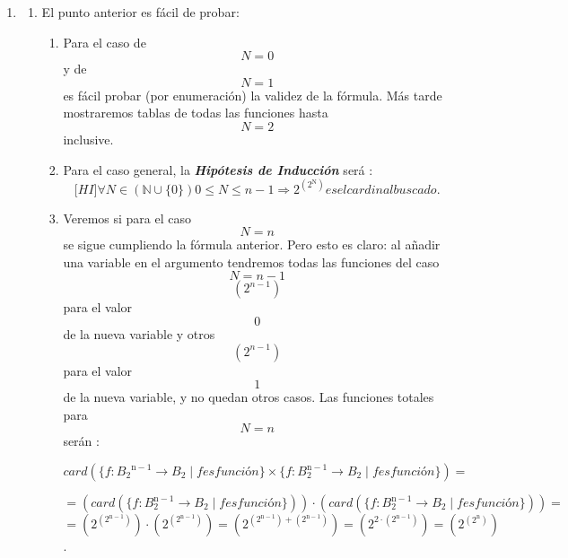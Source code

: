 \documentclass[
]{article}
\begin{document}
\begin{enumerate}
\def\labelenumi{\arabic{enumi}.}
\setcounter{enumi}{6}
\item
  \begin{enumerate}
  \def\labelenumii{\arabic{enumii}.}
  \item
    El punto anterior es fácil de probar:

    \begin{enumerate}
    \def\labelenumiii{\arabic{enumiii}.}
    \item
      Para el caso de \[N = 0\] y de \[N = 1\] es fácil probar (por
      enumeración) la vali\-dez de la fórmula. Más tarde mostraremos
      tablas de todas las funciones hasta \[N = 2\] inclusive.
    \item
      Para el caso general, la \emph{\textbf{Hipótesis de Inducción}}
      será
      :\[{\lbrack\mathbf{\mathit{HI}}\rbrack}\forall{N \in {({\mathbb{N} \cup {\{ 0\}}})}}{{0 \leq N} \leq {n - 1}}\Rightarrow 2^{(2^{\mathbf{\mathrm{N}}})}\mathit{es}\mathit{el}\mathit{cardinal}\mathit{buscado.}\]
    \item
      Veremos si para el caso \[N = n\] se sigue cumpliendo la fórmula
      anterior. Pero esto es claro: al añadir una variable en el
      argumento tendremos todas las funcio\-nes del caso \[N = {n - 1}\]
      \[(2^{n - 1})\] para el valor \[0\] de la nueva variable y otros
      \[(2^{n - 1})\] para el valor \[1\] de la nueva variable, y no
      quedan otros casos. Las funciones totales para \[N = n\] serán :

      \[\mathit{card}{{({{\{{f:{{B_{\mathbf{\mathrm{2}}}}^{\mathbf{\mathrm{n - 1}}}\rightarrow B_{\mathbf{\mathrm{2}}}}{\mid}f\mathit{es}\mathit{función}}\}} \times {\{{f:{B_{\mathbf{\mathrm{2}}}^{\mathbf{\mathrm{n - 1}}}\rightarrow B_{\mathbf{\mathrm{2}}}}{\mid}f\mathit{es}\mathit{función}}\}}})} =}\]

      \[{= {{({\mathit{card}{({\{{f:{B_{\mathbf{\mathrm{2}}}^{\mathbf{\mathrm{n - 1}}}\rightarrow B_{\mathbf{\mathrm{2}}}}{\mid}f\mathit{es}\mathit{función}}\}})}})} \cdot {({\mathit{card}{({\{{f:{B_{\mathbf{\mathrm{2}}}^{\mathbf{\mathrm{n - 1}}}\rightarrow B_{\mathbf{\mathrm{2}}}}{\mid}f\mathit{es}\mathit{función}}\}})}})}}} =\]
      \[{{{= {{(2^{(2^{\mathbf{\mathrm{n - 1}}})})} \cdot {(2^{(2^{\mathbf{\mathrm{n - 1}}})})}}} = {(2^{{(2^{\mathbf{\mathrm{n - 1}}})} + {(2^{\mathbf{\mathrm{n - 1}}})}})}} = {(2^{2 \cdot {(2^{\mathbf{\mathrm{n - 1}}})}})}} = {(2^{(2^{\mathbf{\mathrm{n}}})})}\].


\end{enumerate}
\end{enumerate}
\end{enumerate}
\end{document}
